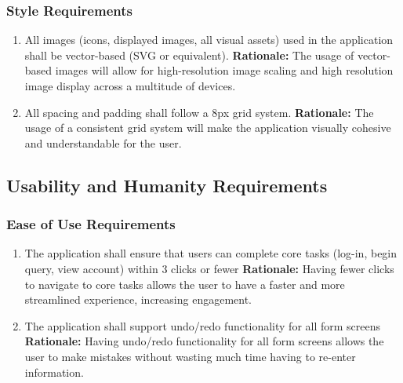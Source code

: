 \documentclass[]{article}
\begin{document}
\subsubsection{Style Requirements}
\label{ssub:style_requirements}
\begin{enumerate}[{LF-S}1. ]
	\item All images (icons, displayed images, all visual assets) used in the application shall be vector-based (SVG or equivalent).
	\newline \textbf{Rationale:} The usage of vector-based images will allow for high-resolution image scaling and high resolution image display across a multitude of devices.
    \item All spacing and padding shall follow a 8px grid system.
    \newline \textbf{Rationale:} The usage of a consistent grid system will make the application visually cohesive and understandable for the user.
\end{enumerate}


\subsection{Usability and Humanity Requirements}
\label{sub:usability_and_humanity_requirements}

\subsubsection{Ease of Use Requirements}
\label{ssub:ease_of_use_requirements}
\begin{enumerate}[{UH-EOU}1. ]
	\item The application shall ensure that users can complete core tasks (log-in, begin query, view account) within 3 clicks or fewer
	\newline \textbf{Rationale:} Having fewer clicks to navigate to core tasks allows the user to have a faster and more streamlined experience, increasing engagement.
    \item The application shall support undo/redo functionality for all form screens
    \newline \textbf{Rationale:} Having undo/redo functionality for all form screens allows the user to make mistakes without wasting much time having to re-enter information.
\end{enumerate}
\end{document}
